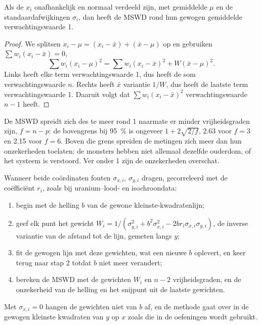\begin{proposition}\label{prop:b3:advanced-geochronology:mswd}
Als de $x_i$ onafhankelijk en normaal verdeeld zijn, met gemiddelde $\mu$ en de
standaardafwijkingen $\sigma_i$, dan heeft de MSWD rond hun gewogen gemiddelde verwachtingswaarde 1.
\end{proposition}

\begin{proof}
We splitsen $x_i - \mu = (x_i - \bar x) + (\bar x - \mu)$ op en gebruiken $\sum
w_i(x_i - \bar x) = 0$,
\[
\sum w_i(x_i - \mu)^2 = \sum w_i(x_i - \bar x)^2 + W(\bar x - \mu)^2.
\]
Links heeft elke term verwachtingswaarde 1, dus heeft de som verwachtingswaarde $n$. Rechts
heeft $\bar x$ variantie $1/W$, dus heeft de laatste term verwachtingswaarde 1.
Daaruit volgt dat $\sum w_i(x_i - \bar x)^2$ verwachtingswaarde $n - 1$ heeft.
\end{proof}

De MSWD spreidt zich des te meer rond 1 naarmate er minder vrijheidsgraden zijn,
$f = n - p$: de bovengrens bij \qty{95}{\percent} is ongeveer $1 +
2\sqrt{2/f}$, 2.63 voor $f = 3$ en 2.15 voor $f = 6$. Boven die grens
spreiden de metingen zich meer dan hun onzekerheden toelaten: de monsters
hebben niet allemaal dezelfde ouderdom, of het systeem is verstoord. Ver onder 1
zijn de onzekerheden overschat.

\begin{method}\label{met:b3:advanced-geochronology:york}
Wanneer beide coördinaten fouten $\sigma_{x,i}$, $\sigma_{y,i}$ dragen, gecorreleerd
met de coëfficiënt $r_i$, zoals bij uranium--lood- en isochroondata:
\begin{enumerate}
\item begin met de helling $b$ van de gewone kleinste-kwadratenlijn;
\item geef elk punt het gewicht $W_i = 1/(\sigma_{y,i}^2 + b^2\sigma_{x,i}^2 -
2br_i\sigma_{x,i}\sigma_{y,i})$, de inverse variantie van de afstand tot de
lijn, gemeten langs $y$;
\item fit de gewogen lijn met deze gewichten, wat een nieuwe $b$ oplevert, en
keer terug naar stap 2 totdat $b$ niet meer verandert;
\item bereken de MSWD met de gewichten $W_i$ en $n - 2$ vrijheidsgraden,
en de onzekerheid van de helling en het snijpunt uit de laatste gewichten.
\end{enumerate}
Met $\sigma_{x,i} = 0$ hangen de gewichten niet van $b$ af, en de methode
gaat over in de gewogen kleinste kwadraten van $y$ op $x$ zoals die in de oefeningen wordt gebruikt.
\end{method}


